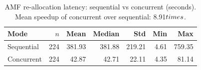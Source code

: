 \begin{table}[htbp]
\centering
\caption{AMF re-allocation latency: sequential vs concurrent (seconds). Mean speedup of concurrent over sequential: 8.91$\\times$.}
\label{tab:comparison}
\begin{tabular}{lrrrrrr}
\hline
Mode & $n$ & Mean & Median & Std & Min & Max \\
\hline
Sequential & 224 & 381.93 & 381.88 & 219.21 & 4.61 & 759.35 \\
Concurrent & 224 & 42.87 & 42.71 & 22.11 & 4.35 & 81.14 \\
\hline
\end{tabular}
\end{table}
